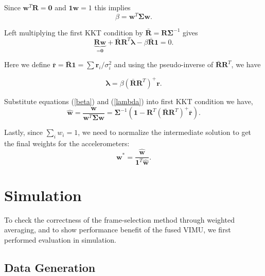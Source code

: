 \documentclass[conference]{IEEEtran}
\begin{document}
\noindent Since $\textbf{w}^T\textbf{R} = \textbf{0}$ and $\textbf{1}\textbf{w} = 1$ this implies
\begin{equation}\label{beta}
    \beta = \textbf{w}^T\bm{\Sigma}\textbf{w}.
\end{equation}

\noindent Left multiplying the first KKT condition by $\bar{\textbf{R}} = \textbf{R}\bm{\Sigma}^{-1}$ gives
\begin{equation}
\underbrace{\textbf{R}\textbf{w}}_{=\textbf{0}} + \bar{\textbf{R}}\textbf{R}^T\bm{\lambda} - \beta\bar{\textbf{R}}\textbf{1} = 0.
\end{equation}

\noindent Here we define $\bar{\textbf{r}} = \bar{\textbf{R}}\textbf{1} = \sum{\textbf{r}_i / \sigma_i^2}$ and using the pseudo-inverse of $\bar{\textbf{R}}\textbf{R}^T$, we have

\begin{equation}\label{lambda}
    \bm{\lambda} = \beta \left(\bar{\textbf{R}}\textbf{R}^T\right)^{+} \textbf{r}.
\end{equation}

\noindent Substitute equations (\ref{beta}) and (\ref{lambda}) into first KKT condition we have,
\begin{equation}
    \hat{\textbf{w}} = \frac{\textbf{w}}{\textbf{w}^T\bm{\Sigma}\textbf{w}} = \bm{\Sigma}^{-1} \left( \textbf{1} - \textbf{R}^T \left(\bar{\textbf{R}}\textbf{R}^T\right)^{+} \bar{\textbf{r}} \right).
\end{equation}

\noindent Lastly, since $\sum_i{w_i} = 1$, we need to normalize the intermediate solution to get the final weights for the accelerometers:
\begin{equation}
    \textbf{w}^* = \frac{\hat{\textbf{w}}}{\textbf{1}^T \hat{\textbf{w}}}.
\end{equation}

\section{Simulation} \label{simulation}

To check the correctness of the frame-selection method through weighted averaging, and to show performance benefit of the fused VIMU, we first performed evaluation in simulation.

\subsection{Data Generation}
\end{document}
